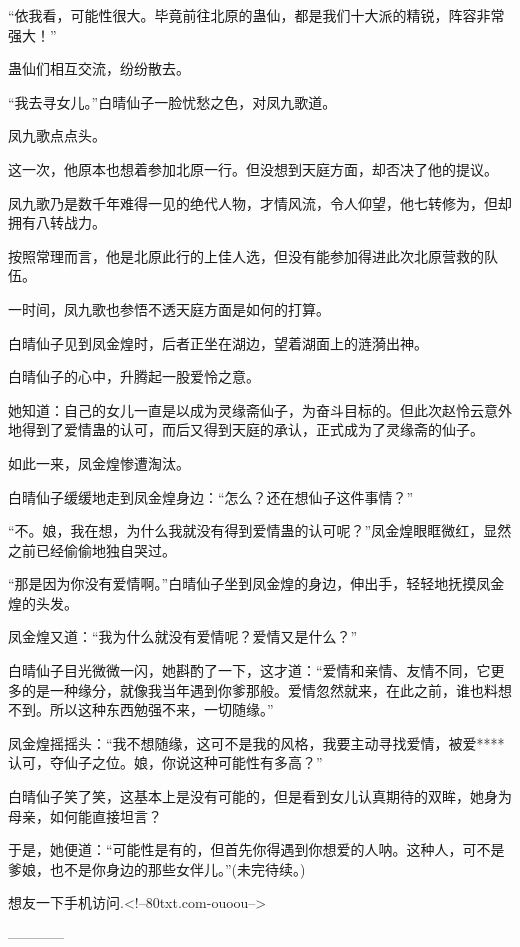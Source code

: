 \begin{this_body}
“依我看，可能性很大。毕竟前往北原的蛊仙，都是我们十大派的精锐，阵容非常强大！”

蛊仙们相互交流，纷纷散去。

“我去寻女儿。”白晴仙子一脸忧愁之色，对凤九歌道。

凤九歌点点头。

这一次，他原本也想着参加北原一行。但没想到天庭方面，却否决了他的提议。

凤九歌乃是数千年难得一见的绝代人物，才情风流，令人仰望，他七转修为，但却拥有八转战力。

按照常理而言，他是北原此行的上佳人选，但没有能参加得进此次北原营救的队伍。

一时间，凤九歌也参悟不透天庭方面是如何的打算。

白晴仙子见到凤金煌时，后者正坐在湖边，望着湖面上的涟漪出神。

白晴仙子的心中，升腾起一股爱怜之意。

她知道：自己的女儿一直是以成为灵缘斋仙子，为奋斗目标的。但此次赵怜云意外地得到了爱情蛊的认可，而后又得到天庭的承认，正式成为了灵缘斋的仙子。

如此一来，凤金煌惨遭淘汰。

白晴仙子缓缓地走到凤金煌身边：“怎么？还在想仙子这件事情？”

“不。娘，我在想，为什么我就没有得到爱情蛊的认可呢？”凤金煌眼眶微红，显然之前已经偷偷地独自哭过。

“那是因为你没有爱情啊。”白晴仙子坐到凤金煌的身边，伸出手，轻轻地抚摸凤金煌的头发。

凤金煌又道：“我为什么就没有爱情呢？爱情又是什么？”

白晴仙子目光微微一闪，她斟酌了一下，这才道：“爱情和亲情、友情不同，它更多的是一种缘分，就像我当年遇到你爹那般。爱情忽然就来，在此之前，谁也料想不到。所以这种东西勉强不来，一切随缘。”

凤金煌摇摇头：“我不想随缘，这可不是我的风格，我要主动寻找爱情，被爱****认可，夺仙子之位。娘，你说这种可能性有多高？”

白晴仙子笑了笑，这基本上是没有可能的，但是看到女儿认真期待的双眸，她身为母亲，如何能直接坦言？

于是，她便道：“可能性是有的，但首先你得遇到你想爱的人呐。这种人，可不是爹娘，也不是你身边的那些女伴儿。”(未完待续。)

想友一下手机访问.<!--80txt.com-ouoou-->

------------

\end{this_body}

